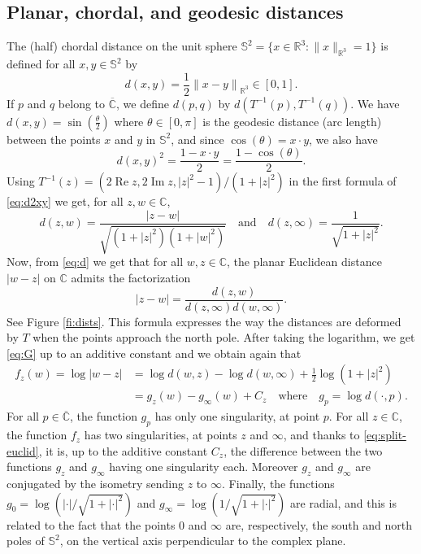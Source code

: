 \documentclass[10pt,reqno]{amsart}
\numberwithin{equation}{section}
\numberwithin{figure}{section}
\theoremstyle{plain}
\newcommand{\<}{\langle}
\renewcommand{\>}{\rangle}
\renewcommand{\Re}{\operatorname{Re}}
\renewcommand{\Im}{\operatorname{Im}}
\begin{document}
\subsection{Planar, chordal, and geodesic distances}
\label{sub:Chordal}
The (half) chordal distance on 
the unit sphere
$\mathbb{S}^2 = \{x \in \mathbb{R}^3 : \|x\|_{\mathbb R^3} = 1\}$ is defined for all $x,y \in \mathbb{S}^2$ by
\begin{equation}\label{eq:dchord}
  d(x,y)
  =\frac{1}{2}{\|x-y\|}_{\mathbb{R}^3}\in[0,1].
\end{equation}
If $p$ and $q$ belong to
$\overline{\mathbb C}$, we define
$d(p,q)$ by $d(T^{-1}(p),T^{-1}(q))$. We
have $d(x,y)=\sin(\frac{\theta}{2})$ where $\theta\in[0,\pi]$ is the geodesic
distance (arc length) between the points $x$ and $y$ in
$\mathbb{S}^2$, and since $\cos(\theta)=x \cdot y$, we also have
\begin{equation}\label{eq:d2xy}
  d(x,y)^2
  =\frac{1-x\cdot y}{2}
  =\frac{1-\cos(\theta)}{2}.
\end{equation}
Using $T^{-1}(z)=(2\Re z,2\Im z,|z|^2-1)/(1+|z|^2)$
 in the first formula of
 \eqref{eq:d2xy} we get,
for all $z,w\in\mathbb{C}$,
\begin{equation}\label{eq:d}
  d(z,w) = \frac{|z-w|}{\sqrt{(1+|z|^2)(1+|w|^2)}}
  \quad\text{and}\quad
  d(z,\infty) = \frac{1}{\sqrt{1+|z|^2}}.
\end{equation}
Now, from \eqref{eq:d} we get that for all $w,z\in\mathbb{C}$, the planar
Euclidean distance $|w-z|$ on $\mathbb{C}$ admits the factorization
\begin{equation}\label{eq:dists}
|z-w|
=
\frac{d(z,w)}{d(z,\infty)d(w,\infty)}.
\end{equation}
See Figure \ref{fi:dists}.
This formula expresses the way the distances are deformed by $T$ when
the points approach the north pole. 
After taking the logarithm,
we get
\eqref{eq:G} up to an additive constant
and we obtain again that
\begin{align}\label{eq:split-euclid}
  f_z(w)
  =\log|w-z|
%
%
  &=\log d(w,z)-\log d(w,\infty)+\frac12\log(1+|z|^2)\\
  &=g_z(w)-g_\infty(w)+C_z
    \quad\text{where}\quad g_p=\log d(\cdot,p).
\end{align}
For all $p\in\overline{\mathbb{C}}$, the function
%
%
%
$g_p$ has only one singularity, at point $p$. For all $z\in\mathbb{C}$, the
function $f_z$ has two singularities, at points $z$ and $\infty$, and thanks
to \eqref{eq:split-euclid}, it is, up to the additive constant $C_z$, the
difference between the two functions $g_z$ and $g_\infty$ having one
singularity each. Moreover $g_z$ and $g_\infty$ are conjugated
by the isometry sending $z$ to $\infty$.
%
%
Finally, the functions $g_0=\log(\left|\cdot\right|/\sqrt{1+\left|\cdot\right|^2})$ and $g_\infty=\log(1/\sqrt{1+\left|\cdot\right|^2})$ are radial, and this is related to the fact that the points $0$ and $\infty$ are, respectively, the south and north poles of $\mathbb{S}^2$, on the vertical axis perpendicular to the complex plane. 
\end{document}
